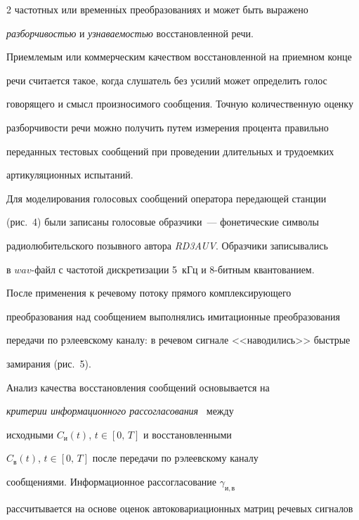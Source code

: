 \begin{multicols}{2}
частотных или временн$\acute{\mbox{ы}}$х преобразованиях и может быть выражено 


\textit{разборчивостью} и \textit{узна\-ва\-емостью} восстановленной речи. 


Приемлемым или коммерческим качеством восстановленной на приемном конце 


речи считается такое, когда слушатель без усилий может определить голос 


говорящего и смысл произносимого сообщения. Точную количественную оценку 


разборчивости речи можно получить путем измерения процента правильно 


переданных тестовых сообщений при проведении длительных и трудоемких 


артикуляционных испытаний.


     


     Для моделирования голосовых сообщений оператора передающей станции 


(рис.~4) были записаны голосовые образчики~--- фонетические символы 


радиолюбительского позывного автора \textit{RD3AUV}. Образчики записывались 


в $wav$-файл с частотой дискретизации 5~кГц и 8-бит\-ным квантованием. 


     


     После применения к речевому потоку прямого комплексирующего 


преобразования над сообщением выполнялись имитационные преобразования 


передачи по рэлеевскому каналу: в речевом сигнале <<наводились>> быстрые 


замирания (рис.~5). 


     


     Анализ качества восстановления сообщений основывается на 


\textit{критерии информационного рассогласования}~\cite{12-pr} между 


исходными $C_{\mathrm{и}}(t)$, $t\in [0,\,T]$ и восстановленными 


$C_{\mathrm{в}}(t)$, $t\in [0,\,T]$ после передачи по рэлеевскому каналу 


сообщениями. Информационное рассогласование $\gamma_{\mathrm{и,в}}$ 


рассчитывается на основе оценок автоковариационных матриц речевых сигналов



\end{multicols}
